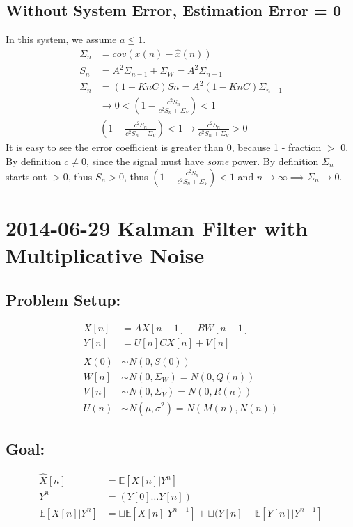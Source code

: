 \documentclass[leqno,twocolumn]{article}
\begin{document}
\subsection{Without System Error, Estimation Error = 0}
In this system, we assume $a \leq 1$.
\begin{align*}
\Sigma_n &= cov(x(n)-\hat{x}(n))\\
S_n &= A^2\Sigma_{n-1} + \Sigma_W = A^2\Sigma_{n-1}\\
\Sigma_n &= (1-KnC)Sn = A^2(1-KnC)\Sigma_{n-1}\\
&\rightarrow 0 < \left(1-\frac{c^2S_n}{c^2S_n+\Sigma_V}\right) < 1\\
& \left(1-\frac{c^2S_n}{c^2S_n+\Sigma_V}\right) < 1 \rightarrow \frac{c^2S_n}{c^2S_n+\Sigma_V} > 0
\end{align*}
It is easy to see the error coefficient is greater than 0, because 1 - fraction $>$ 0. By definition $c \neq 0$, since the signal must have \textit{some} power. By definition $\Sigma_n$ starts out $> 0$, thus $S_n > 0$, thus $\left(1-\frac{c^2S_n}{c^2S_n+\Sigma_V}\right) < 1$ and $n \rightarrow \infty \implies \Sigma_n \rightarrow 0$.

\section{2014-06-29 Kalman Filter with Multiplicative Noise}
\subsection{Problem Setup:}
\begin{align*}
X[n] &= AX[n-1]+BW[n-1]\\
Y[n] &= U[n]CX[n]+V[n]\\
\\
X(0) &\sim N(0,S(0))\\
W[n] &\sim N(0,\Sigma_W) = N(0,Q(n))\\
V[n] &\sim N(0,\Sigma_V) = N(0,R(n))\\
U(n) &\sim N(\mu, \sigma^2) = N(M(n), N(n))
\end{align*}

\subsection{Goal:}
\begin{align*}
\hat{X}[n] &= \mathbb{E}[X[n]|Y^n]\\
Y^n &= (Y[0] \dots Y[n])\\
\mathbb{E}[X[n]|Y^n] &= \sqcup\mathbb{E}[X[n]|Y^{n-1}] + \sqcup(Y[n] - \mathbb{E}[Y[n]|Y^{n-1}]
\end{align*}
\end{document}
